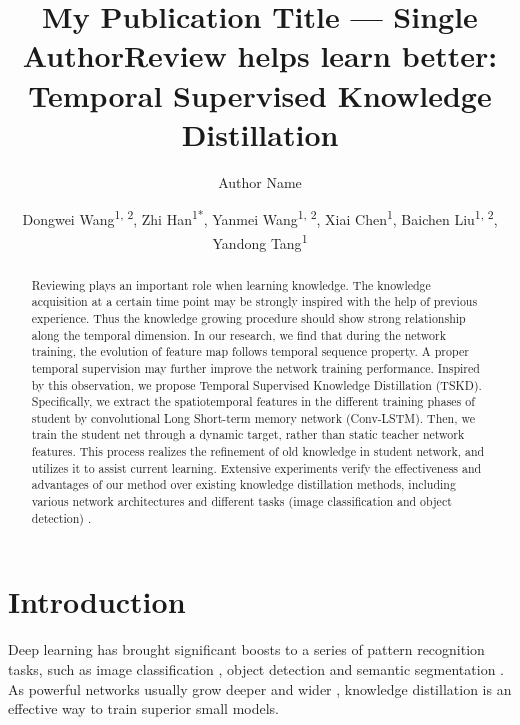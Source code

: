 \documentclass[letterpaper]{article} %
\title{My Publication Title --- Single Author}
\author {
    Author Name
}
\title{Review helps learn better: Temporal Supervised Knowledge Distillation}
\author {
    Dongwei Wang\textsuperscript{\rm 1, 2},
    Zhi Han\textsuperscript{\rm 1*},
    Yanmei Wang\textsuperscript{\rm 1, 2},
    Xiai Chen\textsuperscript{\rm 1},
    Baichen Liu\textsuperscript{\rm 1, 2},
    Yandong Tang\textsuperscript{\rm 1}
}
\begin{document}
\maketitle

\begin{abstract}
Reviewing plays an important role when learning knowledge. The knowledge acquisition at a certain time point may be strongly inspired with the help of previous experience. Thus the knowledge growing procedure should show strong relationship along the temporal dimension.
        In our research, we find that during the network training, the evolution of feature map follows temporal sequence property. A proper temporal supervision may further improve the network training performance. 
        Inspired by this observation, we propose Temporal Supervised Knowledge Distillation (TSKD). Specifically, we extract the spatiotemporal features in the different training phases of student by convolutional Long Short-term memory network (Conv-LSTM). Then, we train the student net through a dynamic target, rather than static teacher network features. This process realizes the refinement of old knowledge in student network, and utilizes it to assist current learning. 
        Extensive experiments verify the effectiveness and advantages of our method over existing knowledge distillation methods, including various network architectures and different tasks (image classification and object detection) .
\end{abstract}

\section{Introduction}

Deep learning \cite{lecun2015deep} has brought significant boosts to a series of pattern recognition tasks, such as image classification \cite{simonyan2014very,krizhevsky2017imagenet,you2020greedynas,zhang2018shufflenet}, object detection \cite{girshick2015fast,redmon2016you,he2017mask} and semantic segmentation \cite{zhao2017pyramid,chen2017rethinking}. As powerful networks usually grow deeper and wider \cite{xie2017aggregated,dosovitskiy2020image}, knowledge distillation is an effective way to train superior small models. 
\end{document}
